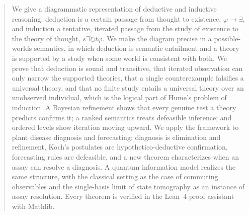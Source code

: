 \begin{abstract}
We give a diagrammatic representation of deductive and inductive reasoning: deduction is a certain
passage from thought to existence, $\varphi\to\exists$, and induction a tentative, iterated passage
from the study of existence to the theory of thought, $s\exists\circlearrowright t\varphi$. We make
the diagram precise in a possible-worlds semantics, in which deduction is semantic entailment and a
theory is supported by a study when some world is consistent with both. We prove that deduction is
sound and transitive, that iterated observation can only narrow the supported theories, that a
single counterexample falsifies a universal theory, and that no finite study entails a universal
theory over an unobserved individual, which is the logical part of Hume's problem of induction. A
Bayesian refinement shows that every genuine test a theory predicts confirms it; a ranked semantics
treats defeasible inference; and ordered levels show iteration moving upward. We apply the
framework to plant disease diagnosis and forecasting: diagnosis is elimination and refinement,
Koch's postulates are hypothetico-deductive confirmation, forecasting rules are defeasible, and a
new theorem characterizes when an assay can resolve a diagnosis. A quantum information model
realizes the same structure, with the classical setting as the case of commuting observables and
the single-basis limit of state tomography as an instance of assay resolution. Every theorem is
verified in the Lean~4 proof assistant with Mathlib.
\end{abstract}
